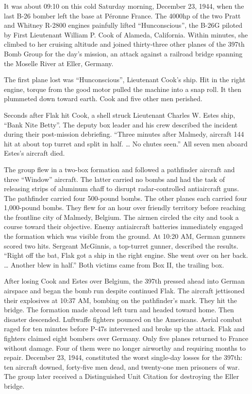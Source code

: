 \documentclass{article}
\begin{document}
\begin{multicols}{3}
It was about 09:10 on this cold Saturday morning, December 23, 1944, 
when the last B-26 bomber left the base at Péronne France. The 4000hp 
of the two Pratt and Whitney R-2800 engines painfully lifted 
``Hunconscious”, the B-26G piloted by First Lieutenant William P. 
Cook of Alameda, California. Within minutes, she climbed to her 
cruising altitude and joined thirty-three other planes of the 
397th Bomb Group for the day’s mission, an attack against a railroad 
bridge spanning the Moselle River at Eller, Germany.

The first plane lost was ``Hunconscious”, Lieutenant Cook’s ship. 
Hit in the right engine, torque from the good motor pulled the 
machine into a snap roll. It then plummeted down toward earth. 
Cook and five other men perished.

Seconds after Flak hit Cook, a shell struck Lieutenant 
Charles W. Estes ship, ``Bank Nite Betty”. The deputy box 
leader and his crew described the incident during their 
post-mission debriefing. ``Three minutes after Malmedy, aircraft 
144 hit at about top turret and split in half. … No chutes seen.” 
All seven men aboard Estes’s aircraft died.

The group flew in a two-box formation and followed a pathfinder 
aircraft and three ``Window” aircraft. The latter carried 
no bombs and had the task of releasing strips of aluminum 
chaff to disrupt radar-controlled antiaircraft guns. The 
pathfinder carried four 500-pound bombs. The other planes 
each carried four 1,000-pound bombs. They flew for an hour 
over friendly territory before reaching the frontline city 
of Malmedy, Belgium. The airmen circled the city and took 
a course toward their objective. Enemy antiaircraft batteries 
immediately engaged the formation which was visible from the 
ground. At 10:20 AM, German gunners scored two hits. Sergeant 
McGinnis, a top-turret gunner, described the results. 
``Right off the bat, Flak got a ship in the right engine. 
She went over on her back. … Another blew in half.” 
Both victims came from Box II, the trailing box.

After losing Cook and Estes over Belgium, the 397th pressed ahead into German airspace and began the bomb run despite continued Flak. The aircraft jettisoned their explosives at 10:37 AM, bombing on the pathfinder’s mark. They hit the bridge. The formation made abroad left turn and headed toward home. Then disaster descended. Luftwaffe fighters pounced on the Americans. Aerial combat raged for ten minutes before P-47s intervened and broke up the attack. Flak and fighters claimed eight bombers over Germany. Only five planes returned to France without damage. Four of them were no longer airworthy and requiring months to repair. December 23, 1944, constituted the worst single-day losses for the 397th: ten aircraft downed, forty-five men dead, and twenty-one men prisoners of war. The group later received a Distinguished Unit Citation for destroying the Eller bridge.


\end{multicols}
\end{document}
